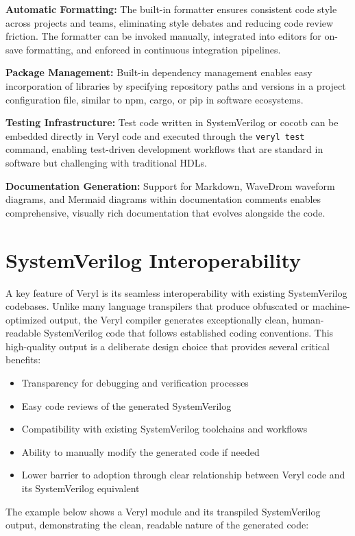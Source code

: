 \documentclass[conference]{IEEEtran}
\begin{document}
\textbf{Automatic Formatting:} The built-in formatter ensures consistent code
style across projects and teams, eliminating style debates and reducing code
review friction. The formatter can be invoked manually, integrated into editors
for on-save formatting, and enforced in continuous integration pipelines.

\textbf{Package Management:} Built-in dependency management enables easy
incorporation of libraries by specifying repository paths and versions in a
project configuration file, similar to npm, cargo, or pip in software
ecosystems.

\textbf{Testing Infrastructure:} Test code written in SystemVerilog or cocotb
can be embedded directly in Veryl code and executed through the \texttt{veryl
test} command, enabling test-driven development workflows that are standard in
software but challenging with traditional HDLs.

\textbf{Documentation Generation:} Support for Markdown, WaveDrom waveform
diagrams, and Mermaid diagrams within documentation comments enables
comprehensive, visually rich documentation that evolves alongside the code.

\section{SystemVerilog Interoperability}
A key feature of Veryl is its seamless interoperability with existing
SystemVerilog codebases. Unlike many language transpilers that produce
obfuscated or machine-optimized output, the Veryl compiler generates
exceptionally clean, human-readable SystemVerilog code that follows established
coding conventions. This high-quality output is a deliberate design choice that
provides several critical benefits:

\begin{itemize}
    \item Transparency for debugging and verification processes
    \item Easy code reviews of the generated SystemVerilog
    \item Compatibility with existing SystemVerilog toolchains and workflows
    \item Ability to manually modify the generated code if needed
    \item Lower barrier to adoption through clear relationship between Veryl
        code and its SystemVerilog equivalent
\end{itemize}

The example below shows a Veryl module and its transpiled SystemVerilog output, demonstrating the clean, readable nature of the generated code:
\end{document}
